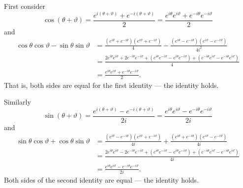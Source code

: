 \documentclass[12 pt, letterpaper]{hmcpset}
\begin{document}
\begin{solution}
\begin{enumerate}
			First consider
			\[
				\cos{(\theta + \vartheta)} = \frac{e^{i(\theta + \vartheta)} + e^{-i(\theta + \vartheta)}}{2} = \frac{e^{i \theta} e^{i \vartheta} + e^{-i \theta} e^{-i \vartheta}}{2}
			\]
			and
			\begin{align*}
				\cos{\theta} \cos{\vartheta} - \sin{\theta} \sin{\vartheta} & = \frac{(e^{i \theta} + e^{-i \theta}) (e^{i \vartheta} + e^{-i \vartheta})}{4} - \frac{(e^{i \theta} - e^{-i \theta}) (e^{i \vartheta} - e^{-i \vartheta})}{4 i^{2}} \\
											    & = \frac{2 e^{i \theta} e^{i \vartheta} + 2 e^{-i \theta} e^{-i \vartheta} + (e^{i \theta} e^{-i \vartheta} - e^{i \theta} e^{-i \vartheta}) + (e^{-i \theta} e^{i \vartheta} - e^{-i \theta} e^{i \vartheta})}{4} \\
											    & = \frac{e^{i \theta} e^{i \vartheta} + e^{-i \theta} e^{-i \vartheta}}{2}.
			\end{align*}
			That is, both sides are equal for the first identity --- the identity holds.

			Similarly
			\[
				\sin{(\theta + \vartheta)} = \frac{e^{i(\theta + \vartheta)} - e^{-i(\theta + \vartheta)}}{2i} = \frac{e^{i \theta} e^{i \vartheta} - e^{-i \theta} e^{-i \vartheta}}{2i}
			\]
			and
			\begin{align*}
				\sin{\theta} \cos{\vartheta} + \cos{\theta} \sin{\vartheta} & = \frac{(e^{i \theta} - e^{-i \theta}) (e^{i \vartheta} + e^{-i \vartheta})}{4i} + \frac{(e^{i \theta} + e^{-i \theta}) (e^{i \vartheta} - e^{-i \vartheta})}{4i} \\
											    & = \frac{2 e^{i \theta} e^{i \vartheta} - 2 e^{-i \theta} e^{-i \vartheta} + (e^{i \theta} e^{-i \vartheta} - e^{i \theta} e^{-i \vartheta}) + (e^{-i \theta} e^{i \vartheta} - e^{-i \theta} e^{i \vartheta})}{4i} \\
											    & = \frac{e^{i \theta} e^{i \vartheta} - e^{-i \theta} e^{-i \vartheta}}{2i}.
			\end{align*}
			Both sides of the second identity are equal --- the identity holds.


\end{enumerate}
\end{solution}
\end{document}

